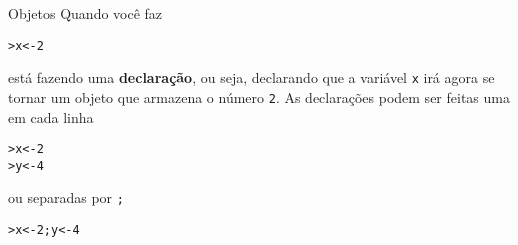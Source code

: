 \documentclass[10pt,handout]{beamer}\usepackage{graphicx, color}
\makeatletter
\newenvironment{kframe}{%
 \def\at@end@of@kframe{}%
 \ifinner\ifhmode%
  \def\at@end@of@kframe{\end{minipage}}%
  \begin{minipage}{\columnwidth}%
 \fi\fi%
 \def\FrameCommand##1{\hskip\@totalleftmargin \hskip-\fboxsep
 \colorbox{shadecolor}{##1}\hskip-\fboxsep
     \hskip-\linewidth \hskip-\@totalleftmargin \hskip\columnwidth}%
 \MakeFramed {\advance\hsize-\width
   \@totalleftmargin\z@ \linewidth\hsize
   \@setminipage}}%
 {\par\unskip\endMakeFramed%
 \at@end@of@kframe}
\newenvironment{knitrout}{}{} %
\makeatother
\begin{document}
\begin{frame}[fragile=singleslide]{Objetos}
Quando você faz
\begin{knitrout}\small
{}\color{fgcolor}\begin{kframe}
\begin{alltt}
> x <- 2
\end{alltt}
\end{kframe}
\end{knitrout}

está fazendo uma \textbf{declaração}, ou seja, declarando que a variável
\verb|x| irá agora se tornar um objeto que armazena o número
\verb|2|. As declarações podem ser feitas uma em cada linha
\begin{knitrout}\small
{}\color{fgcolor}\begin{kframe}
\begin{alltt}
> x <- 2
> y <- 4
\end{alltt}
\end{kframe}
\end{knitrout}

ou separadas por \verb|;|
\begin{knitrout}\small
{}\color{fgcolor}\begin{kframe}
\begin{alltt}
> x <- 2; y <- 4
\end{alltt}
\end{kframe}
\end{knitrout}

\end{frame}
\end{document}
